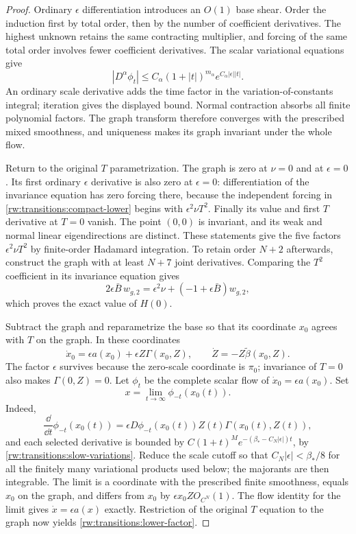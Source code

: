 \begin{proof}
Ordinary $\epsilon$ differentiation introduces an $O(1)$ base
shear.  Order the induction first by total order, then by the number
of coefficient derivatives.  The highest unknown retains the same
contracting multiplier, and forcing of the same total order involves
fewer coefficient derivatives.  The scalar
variational equations give
\begin{equation}\label{rw:transitions:slow-variations}
 |D^\alpha\phi_t|\le C_\alpha(1+|t|)^{m_\alpha}
                       e^{C_\alpha|\epsilon||t|}.
\end{equation}
An ordinary scale derivative adds the time factor in the
variation-of-constants integral; iteration gives the displayed bound.
Normal contraction absorbs all finite polynomial factors. The graph
transform therefore converges with the prescribed mixed smoothness,
and uniqueness makes its graph invariant under the whole flow.

Return to the original $T$ parametrization. The graph is zero at
$\nu=0$ and at $\epsilon=0$. Its first ordinary $\epsilon$
derivative is also zero at $\epsilon=0$: differentiation of the
invariance equation has zero forcing there, because the independent
forcing in \eqref{rw:transitions:compact-lower} begins with
$\epsilon^2\nu T^2$. Finally its value and first $T$ derivative at
$T=0$ vanish. The point $(0,0)$ is invariant, and its weak and normal
linear eigendirections are distinct. These statements give the five
factors $\epsilon^2\nu T^2$ by finite-order Hadamard integration.
To retain order $N+2$ afterwards, construct the graph with at least
$N+7$ joint derivatives. Comparing the $T^2$ coefficient in its
invariance equation gives
\[
 2\epsilon\bar B\,w_{g,2}
   =\epsilon^2\nu+(-1+\epsilon\bar B)w_{g,2},
\]
which proves the exact value of $H(0)$.

Subtract the graph and reparametrize the base so that its coordinate
$x_0$ agrees with $T$ on the graph. In these coordinates
\[
 \dot x_0=\epsilon a(x_0)+\epsilon Z\Gamma(x_0,Z),
 \qquad \dot Z=-Z\widetilde\beta(x_0,Z).
\]
The factor $\epsilon$ survives because the zero-scale coordinate is
$\pi_0$; invariance of $T=0$ also makes $\Gamma(0,Z)=0$.
Let $\phi_t$ be the complete scalar flow of $\dot x_0=\epsilon a(x_0)$.
Set
\[
 x=\lim_{t\to\infty}\phi_{-t}(x_0(t)).
\]
Indeed,
\[
 \frac{\dd}{\dd t}\phi_{-t}(x_0(t))
   =\epsilon D\phi_{-t}(x_0(t))Z(t)\Gamma(x_0(t),Z(t)),
\]
and each selected derivative is bounded by
$C(1+t)^M e^{-(\beta_*-C_N|\epsilon|)t}$, by
\eqref{rw:transitions:slow-variations}. Reduce the scale cutoff so
that $C_N|\epsilon|<\beta_*/8$ for all the finitely many variational
products used below; the majorants are then integrable. The limit is a
coordinate with the prescribed finite smoothness, equals $x_0$ on
the graph, and differs from
$x_0$ by $\epsilon x_0ZO_{C^N}(1)$. The flow identity for the limit
gives $\dot x=\epsilon a(x)$ exactly. Restriction of the original
$T$ equation to the graph now yields
\eqref{rw:transitions:lower-factor}.


\end{proof}
